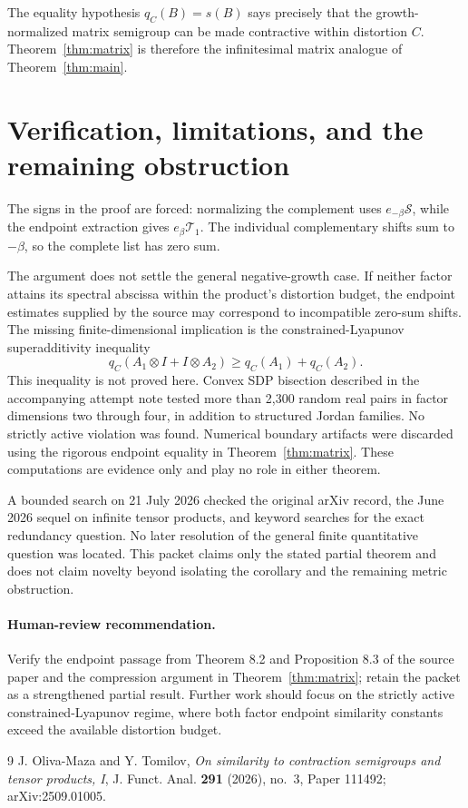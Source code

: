 \documentclass[11pt]{article}
\newcommand{\T}{\mathcal T}
\newcommand{\Sg}{\mathcal S}
\begin{document}
The equality hypothesis $q_C(B)=s(B)$ says precisely that the
growth-normalized matrix semigroup can be made contractive within distortion
$C$.  Theorem~\ref{thm:matrix} is therefore the infinitesimal matrix analogue
of Theorem~\ref{thm:main}.

\section{Verification, limitations, and the remaining obstruction}

The signs in the proof are forced: normalizing the complement uses
$e_{-\beta}\Sg$, while the endpoint extraction gives $e_{\beta}\T_1$.
The individual complementary shifts sum to $-\beta$, so the complete list
has zero sum.

The argument does not settle the general negative-growth case.  If neither
factor attains its spectral abscissa within the product's distortion budget,
the endpoint estimates supplied by the source may correspond to incompatible
zero-sum shifts.  The missing finite-dimensional implication is the
constrained-Lyapunov superadditivity inequality
\[
 q_C(A_1\otimes I+I\otimes A_2)
 \geq q_C(A_1)+q_C(A_2).
\]
This inequality is not proved here.  Convex SDP bisection described in the
accompanying attempt note tested more than 2,300 random real pairs in factor
dimensions two through four, in addition to structured Jordan families.  No
strictly active violation was found.  Numerical boundary artifacts were
discarded using the rigorous endpoint equality in
Theorem~\ref{thm:matrix}.  These computations are evidence only and play no
role in either theorem.

A bounded search on 21 July 2026 checked the original arXiv record, the June
2026 sequel on infinite tensor products, and keyword searches for the exact
redundancy question.  No later resolution of the general finite quantitative
question was located.  This packet claims only the stated partial theorem and
does not claim novelty beyond isolating the corollary and the remaining
metric obstruction.

\paragraph{Human-review recommendation.}
Verify the endpoint passage from Theorem 8.2 and Proposition 8.3 of the source
paper and the compression argument in Theorem~\ref{thm:matrix}; retain the
packet as a strengthened partial result.  Further work should focus on the
strictly active constrained-Lyapunov regime, where both factor endpoint
similarity constants exceed the available distortion budget.

\begin{thebibliography}{9}
J. Oliva-Maza and Y. Tomilov,
\emph{On similarity to contraction semigroups and tensor products, I},
J. Funct. Anal. \textbf{291} (2026), no.~3, Paper 111492;
arXiv:2509.01005.
\end{thebibliography}
\end{document}
